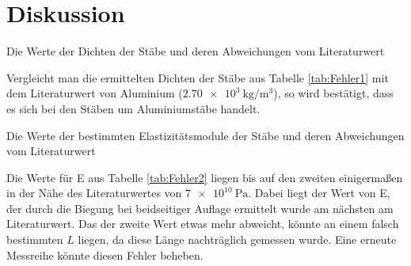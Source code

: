 
\section{Diskussion}
\label{sec:Diskussion}

\begin{table}
	\centering
	\caption{Die Werte der Dichten der Stäbe und deren Abweichungen vom Literaturwert}
	
	\label{tab:Fehler1}
\end{table}
\noindent Vergleicht man die ermittelten Dichten der Stäbe aus Tabelle \ref{tab:Fehler1} mit dem Literaturwert von Aluminium ($\SI{2,70e3}{\kilogram\per\cubic\metre}$\cite{Dichte}), so wird bestätigt, dass es sich bei den Stäben um Aluminiumstäbe handelt.

\begin{table}
	\centering
	\caption{Die Werte der bestimmten Elastizitätsmodule der Stäbe und deren Abweichungen vom Literaturwert}
	
	\label{tab:Fehler2}
\end{table}

\noindent Die Werte für E aus Tabelle \ref{tab:Fehler2} liegen bis auf den zweiten einigermaßen in der Nähe des Literaturwertes von $\SI{7e10}{\pascal}$\cite{ElastizitaetsmodulAlu}.
Dabei liegt der Wert von E, der durch die Biegung bei beidseitiger Auflage ermittelt wurde am nächsten am Literaturwert. Das der zweite Wert etwas mehr abweicht, könnte an einem falsch bestimmten $L$ liegen, da diese Länge nachträglich gemessen wurde. Eine erneute Messreihe könnte diesen Fehler beheben. 